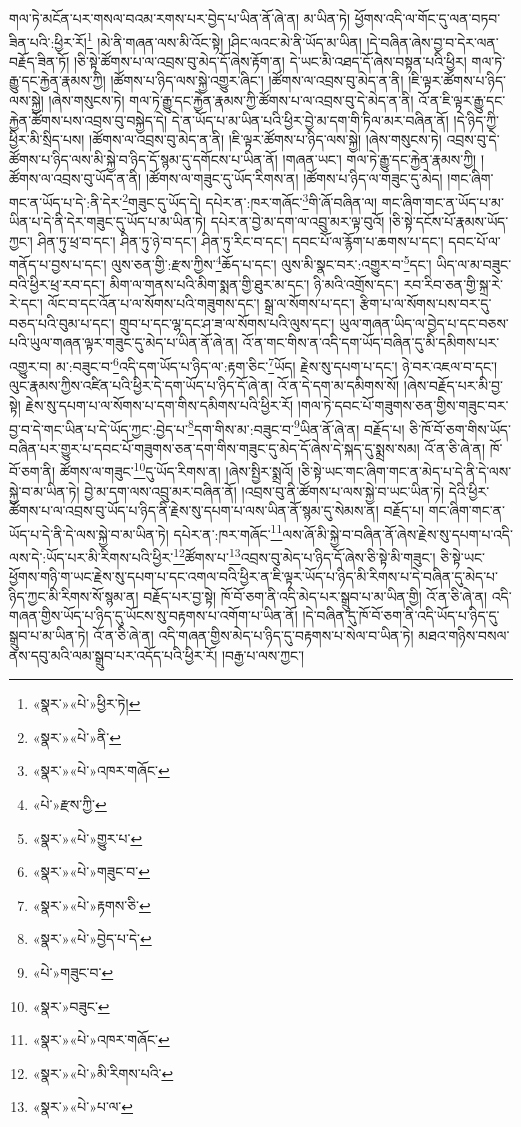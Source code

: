 གལ་ཏེ་མངོན་པར་གསལ་བའམ་རགས་པར་བྱེད་པ་ཡིན་ནོ་ཞེ་ན། མ་ཡིན་ཏེ། ཕྱོགས་འདི་ལ་གོང་དུ་ལན་བཏབ་ཟིན་པའི་:ཕྱིར་རོ།\footnote{«སྣར་»«པེ་»ཕྱིར་ཏེ།} །མེ་ནི་གཞན་ལས་མི་འོང་སྟེ། །ཤིང་ལའང་མེ་ནི་ཡོད་མ་ཡིན། །དེ་བཞིན་ཞེས་བྱ་བ་དེར་ལན་བརྗོད་ཟིན་ཏོ། །ཅི་སྟེ་ཚོགས་པ་ལ་འབྲས་བུ་མེད་དོ་ཞེས་རྟོག་ན། དེ་ཡང་མི་འཐད་དོ་ཞེས་བསྟན་པའི་ཕྱིར། གལ་ཏེ་རྒྱུ་དང་རྐྱེན་རྣམས་ཀྱི། །ཚོགས་པ་ཉིད་ལས་སྐྱེ་འགྱུར་ཞིང་། །ཚོགས་ལ་འབྲས་བུ་མེད་ན་ནི། །ཇི་ལྟར་ཚོགས་པ་ཉིད་ལས་སྐྱེ། །ཞེས་གསུངས་ཏེ། གལ་ཏེ་རྒྱུ་དང་རྐྱེན་རྣམས་ཀྱི་ཚོགས་པ་ལ་འབྲས་བུ་དེ་མེད་ན་ནི། འོ་ན་ཇི་ལྟར་རྒྱུ་དང་རྐྱེན་ཚོགས་པས་འབྲས་བུ་བསྐྱེད་དེ། དེ་ན་ཡོད་པ་མ་ཡིན་པའི་ཕྱིར་བྱེ་མ་དག་གི་ཏིལ་མར་བཞིན་ནོ། །དེ་ཉིད་ཀྱི་ཕྱིར་མི་སྲིད་པས། །ཚོགས་ལ་འབྲས་བུ་མེད་ན་ནི། །ཇི་ལྟར་ཚོགས་པ་ཉིད་ལས་སྐྱེ། །ཞེས་གསུངས་ཏེ། འབྲས་བུ་དེ་ཚོགས་པ་ཉིད་ལས་མི་སྐྱེ་བ་ཉིད་དོ་སྙམ་དུ་དགོངས་པ་ཡིན་ནོ། །གཞན་ཡང་། གལ་ཏེ་རྒྱུ་དང་རྐྱེན་རྣམས་ཀྱི། །ཚོགས་ལ་འབྲས་བུ་ཡོད་ན་ནི། །ཚོགས་ལ་གཟུང་དུ་ཡོད་རིགས་ན། །ཚོགས་པ་ཉིད་ལ་གཟུང་དུ་མེད། །གང་ཞིག་གང་ན་ཡོད་པ་དེ་:ནི་དེར་\footnote{«སྣར་»«པེ་»ནི་}གཟུང་དུ་ཡོད་དེ། དཔེར་ན་:ཁར་གཞོང་\footnote{«སྣར་»«པེ་»འཁར་གཞོང་}གི་ཞོ་བཞིན་ལ། གང་ཞིག་གང་ན་ཡོད་པ་མ་ཡིན་པ་དེ་ནི་དེར་གཟུང་དུ་ཡོད་པ་མ་ཡིན་ཏེ། དཔེར་ན་བྱེ་མ་དག་ལ་འབྲུ་མར་ལྟ་བུའོ། །ཅི་སྟེ་དངོས་པོ་རྣམས་ཡོད་ཀྱང་། ཤིན་ཏུ་ཕྲ་བ་དང་། ཤིན་ཏུ་ཉེ་བ་དང་། ཤིན་ཏུ་རིང་བ་དང་། དབང་པོ་ལ་རྙོག་པ་ཆགས་པ་དང་། དབང་པོ་ལ་གནོད་པ་བྱས་པ་དང་། ལུས་ཅན་གྱི་:རྫས་ཀྱིས་\footnote{«པེ་»རྫས་ཀྱི་}ཆོད་པ་དང་། ལུས་མི་སྣང་བར་:འགྱུར་བ་\footnote{«སྣར་»«པེ་»གྱུར་པ་}དང་། ཡིད་ལ་མ་བཟུང་བའི་ཕྱིར་ཕྲ་རབ་དང་། མིག་ལ་གནས་པའི་མིག་སྨན་གྱི་ཐུར་མ་དང་། ཉི་མའི་འགྲོས་དང་། རབ་རིབ་ཅན་གྱི་སྐྲ་རེ་རེ་དང་། ལོང་བ་དང་འོན་པ་ལ་སོགས་པའི་གཟུགས་དང་། སྒྲ་ལ་སོགས་པ་དང་། རྩིག་པ་ལ་སོགས་པས་བར་དུ་བཅད་པའི་བུམ་པ་དང་། གྲུབ་པ་དང་ལྷ་དང་ཤ་ཟ་ལ་སོགས་པའི་ལུས་དང་། ཡུལ་གཞན་ཡིད་ལ་བྱེད་པ་དང་བཅས་པའི་ཡུལ་གཞན་ལྟར་གཟུང་དུ་མེད་པ་ཡིན་ནོ་ཞེ་ན། འོ་ན་གང་གིས་ན་འདི་དག་ཡོད་བཞིན་དུ་མི་དམིགས་པར་འགྱུར་བ། མ་:བཟུང་བ་\footnote{«སྣར་»«པེ་»གཟུང་བ་}འདི་དག་ཡོད་པ་ཉིད་ལ་:རྟག་ཅིང་\footnote{«སྣར་»«པེ་»རྟགས་ཅི་}ཡོད། རྗེས་སུ་དཔག་པ་དང་། ཉེ་བར་འཇལ་བ་དང་། ལུང་རྣམས་ཀྱིས་འཛིན་པའི་ཕྱིར་དེ་དག་ཡོད་པ་ཉིད་དོ་ཞེ་ན། འོ་ན་དེ་དག་མ་དམིགས་སོ། །ཞེས་བརྗོད་པར་མི་བྱ་སྟེ། རྗེས་སུ་དཔག་པ་ལ་སོགས་པ་དག་གིས་དམིགས་པའི་ཕྱིར་རོ། །གལ་ཏེ་དབང་པོ་གཟུགས་ཅན་གྱིས་གཟུང་བར་བྱ་བ་དེ་གང་ཡིན་པ་དེ་ཡོད་ཀྱང་:བྱེད་པ་\footnote{«སྣར་»«པེ་»བྱེད་པ་དེ་}དག་གིས་མ་:བཟུང་བ་\footnote{«པེ་»གཟུང་བ་}ཡིན་ནོ་ཞེ་ན། བརྗོད་པ། ཅི་ཁོ་བོ་ཅག་གིས་ཡོད་བཞིན་པར་གྱུར་པ་དབང་པོ་གཟུགས་ཅན་དག་གིས་གཟུང་དུ་མེད་དོ་ཞེས་དེ་སྐད་དུ་སྨྲས་སམ། འོ་ན་ཅི་ཞེ་ན། ཁོ་བོ་ཅག་ནི། ཚོགས་ལ་གཟུང་\footnote{«སྣར་»བཟུང་}དུ་ཡོད་རིགས་ན། །ཞེས་སྤྱིར་སྨྲའོ། །ཅི་སྟེ་ཡང་གང་ཞིག་གང་ན་མེད་པ་དེ་ནི་དེ་ལས་སྐྱེ་བ་མ་ཡིན་ཏེ། བྱེ་མ་དག་ལས་འབྲུ་མར་བཞིན་ནོ། །འབྲས་བུ་ནི་ཚོགས་པ་ལས་སྐྱེ་བ་ཡང་ཡིན་ཏེ། དེའི་ཕྱིར་ཚོགས་པ་ལ་འབྲས་བུ་ཡོད་པ་ཉིད་ནི་རྗེས་སུ་དཔག་པ་ལས་ཡིན་ནོ་སྙམ་དུ་སེམས་ན། བརྗོད་པ། གང་ཞིག་གང་ན་ཡོད་པ་དེ་ནི་དེ་ལས་སྐྱེ་བ་མ་ཡིན་ཏེ། དཔེར་ན་:ཁར་གཞོང་\footnote{«སྣར་»«པེ་»འཁར་གཞོང་}ལས་ཞོ་མི་སྐྱེ་བ་བཞིན་ནོ་ཞེས་རྗེས་སུ་དཔག་པ་འདི་ལས་དེ་:ཡོད་པར་མི་རིགས་པའི་ཕྱིར་\footnote{«སྣར་»«པེ་»མི་རིགས་པའི་}ཚོགས་པ་\footnote{«སྣར་»«པེ་»པ་ལ་}འབྲས་བུ་མེད་པ་ཉིད་དོ་ཞེས་ཅི་སྟེ་མི་གཟུང་། ཅི་སྟེ་ཡང་ཕྱོགས་གཉི་ག་ཡང་རྗེས་སུ་དཔག་པ་དང་འགལ་བའི་ཕྱིར་ན་ཇི་ལྟར་ཡོད་པ་ཉིད་མི་རིགས་པ་དེ་བཞིན་དུ་མེད་པ་ཉིད་ཀྱང་མི་རིགས་སོ་སྙམ་ན། བརྗོད་པར་བྱ་སྟེ། ཁོ་བོ་ཅག་ནི་འདི་མེད་པར་སྒྲུབ་པ་མ་ཡིན་གྱི། འོ་ན་ཅི་ཞེ་ན། འདི་གཞན་གྱིས་ཡོད་པ་ཉིད་དུ་ཡོངས་སུ་བརྟགས་པ་འགོག་པ་ཡིན་ནོ། །དེ་བཞིན་དུ་ཁོ་བོ་ཅག་ནི་འདི་ཡོད་པ་ཉིད་དུ་སྒྲུབ་པ་མ་ཡིན་ཏེ། འོ་ན་ཅི་ཞེ་ན། འདི་གཞན་གྱིས་མེད་པ་ཉིད་དུ་བརྟགས་པ་སེལ་བ་ཡིན་ཏེ། མཐའ་གཉིས་བསལ་ནས་དབུ་མའི་ལམ་སྒྲུབ་པར་འདོད་པའི་ཕྱིར་རོ། །བརྒྱ་པ་ལས་ཀྱང་། 